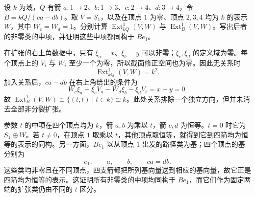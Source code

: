 \begin{optionalexercise}\label{b5:ex:09-diamond-relation-extension-space}
	设 \(k\) 为域，\(Q\) 有箭 \(a:1\to2\)、\(b:1\to3\)、\(c:2\to4\)、\(d:3\to4\)，令 \(B=kQ/(ca-db)\)。取 \(V=S_1\)，以及在顶点 \(1\) 为零、顶点 \(2,3,4\) 均为 \(k\) 的表示 \(W\)，其中 \(W_c=W_d=1\)。分别计算 \(\operatorname{Ext}^1_{kQ}(V,W)\) 与 \(\operatorname{Ext}^1_B(V,W)\)。写出后者的非零类的中项，并证明这些中项都同构于 \(Be_1\)。
\end{optionalexercise}
\begin{solution}
	在扩张的右上角数据中，只有 \(\xi_a=x\)、\(\xi_b=y\) 可以非零；\(\xi_c,\xi_d\) 的定义域为零。每个顶点上的 \(V_i\) 与 \(W_i\) 至少一个为零，所以截面修正空间也为零。因此无关系时
	\[
		\operatorname{Ext}^1_{kQ}(V,W)=k^2.
	\]
	加入关系后，\(ca-db\) 在右上角给出的条件为
	\[
		W_c\xi_a+\xi_cV_a-W_d\xi_b-\xi_dV_b=x-y=0.
	\]
	故 \(\operatorname{Ext}^1_B(V,W)\cong\{(t,t)\mid t\in k\}\cong k\)。此处关系排除一个独立方向，但并未消去全部非分裂扩张。

	参数 \(t\) 的中项在四个顶点均为 \(k\)，箭 \(a,b\) 为乘以 \(t\)，箭 \(c,d\) 为恒等。\(t=0\) 时它为 \(S_1\oplus W\)。若 \(t\ne0\)，在顶点 \(1\) 取乘以 \(t\)，其他顶点取恒等，就得到它到四箭均为恒等的表示的同构。另一方面，\(Be_1\) 以从顶点 \(1\) 出发的路径类为基；四个顶点的基分别为
	\[
		e_1,\qquad a,\qquad b,\qquad ca=db.
	\]
	这些类均非零且在不同顶点，四支箭都把所列基向量送到相应的基向量，故它正是四箭均为恒等的表示。这证明所有非零类的中项均同构于 \(Be_1\)，而它们作为固定两端的扩张类仍由不同的 \(t\) 区分。
\end{solution}

